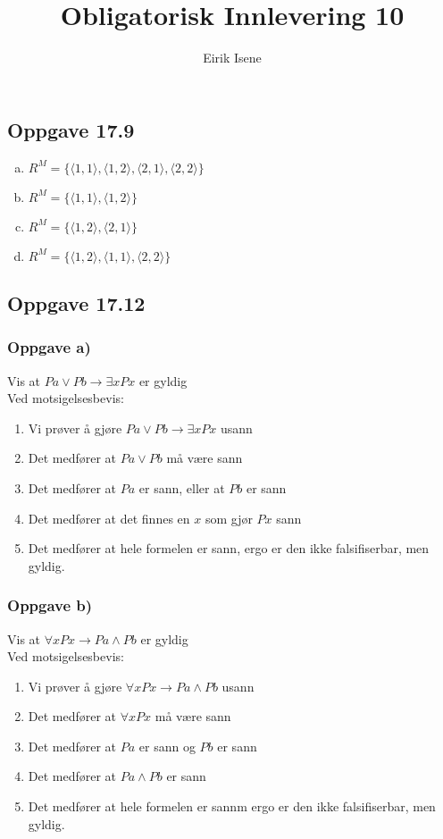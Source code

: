\documentclass[norsk, 12p]{article}
\title{Obligatorisk Innlevering 10}
\author{Eirik Isene}
\begin{document}
\maketitle

\subsection{Oppgave 17.9}
\begin{enumerate}[a)]
\item $R^M = \{\langle 1,1\rangle,\langle 1,2\rangle,\langle 2,1\rangle,\langle 2,2\rangle \}$
\item $R^M = \{\langle 1,1\rangle,\langle 1,2\rangle \}$
\item $R^M = \{\langle 1,2\rangle,\langle 2,1\rangle \}$
\item $R^M = \{\langle 1,2\rangle,\langle 1,1\rangle,\langle 2,2\rangle \}$
\end{enumerate}

\subsection{Oppgave 17.12}

\subsubsection{Oppgave a)}
Vis at $Pa \lor Pb \to \exists xPx$ er gyldig \\
Ved motsigelsesbevis:
\begin{enumerate}
\item Vi prøver å gjøre $Pa \lor Pb \to \exists xPx$ usann
\item Det medfører at $Pa \lor Pb$ må være sann
\item Det medfører at $Pa$ er sann, eller at $Pb$ er sann
\item Det medfører at det finnes en $x$ som gjør $Px$ sann
\item Det medfører at hele formelen er sann, ergo er den ikke falsifiserbar, men gyldig.
\end{enumerate}

\subsubsection{Oppgave b)}
Vis at $\forall xPx \to Pa \land Pb$ er gyldig \\
Ved motsigelsesbevis:
\begin{enumerate}
\item Vi prøver å gjøre $\forall xPx \to Pa \land Pb$ usann
\item Det medfører at $\forall xPx$ må være sann
\item Det medfører at $Pa$ er sann og $Pb$ er sann
\item Det medfører at $Pa \land Pb$ er sann
\item Det medfører at hele formelen er sannm ergo er den ikke falsifiserbar, men gyldig.  
\end{enumerate}
\end{document}
